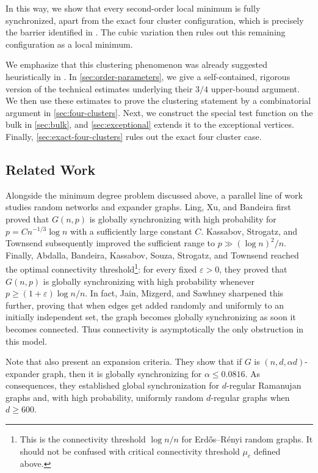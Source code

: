 \documentclass[reqno,11pt]{amsart}
\theoremstyle{definition}
\begin{document}
In this way, we show that every second-order local minimum is fully
synchronized, apart from the exact four cluster configuration, which is
precisely the barrier identified in
\cite[Section~6]{kassabov-strogatz-townsend-dense}. The cubic variation
then rules out this remaining configuration as a local minimum.

We emphasize that this clustering phenomenon was already suggested
heuristically in \cite[Section~6]{kassabov-strogatz-townsend-dense}. In
\cref{sec:order-parameters}, we give a self-contained, rigorous version of
the technical estimates underlying their $3/4$ upper-bound
argument. We then use these estimates to prove the clustering statement by a combinatorial
argument in \cref{sec:four-clusters}. Next, we construct  the special test function on the bulk in \cref{sec:bulk}, and \cref{sec:exceptional} extends it to the exceptional vertices. Finally, \cref{sec:exact-four-clusters}
rules out the exact four cluster case.

\subsection{Related Work}

Alongside the minimum degree problem discussed above, a parallel
line of work studies random networks and expander graphs. Ling, Xu, and
Bandeira \cite{ling-xu-bandeira} first proved that $G(n,p)$ is globally synchronizing with high
probability for $p=Cn^{-1/3}\log n$ with a sufficiently large constant
$C$. Kassabov, Strogatz, and Townsend \cite{kassabov-strogatz-townsend-random} subsequently
improved the sufficient range to $p\gg (\log n)^2/n$. Finally, Abdalla, Bandeira, Kassabov,
Souza, Strogatz, and Townsend \cite{bandeira-expanders} reached the optimal connectivity threshold\footnote{This is the connectivity threshold $\log n / n$ for Erd\H{o}s--R\'{e}nyi random graphs. It should not be confused with critical connectivity threshold $\mu_c$ defined above.}: for every fixed $\varepsilon>0$, they proved that $G(n,p)$ is globally
synchronizing with high probability whenever
$p\geq (1+\varepsilon)\log n/n$. In fact, Jain, Mizgerd, and Sawhney \cite{jain-mizgerd-sawhney} sharpened this further, proving that when edges get added randomly and uniformly to an initially independent set, the graph becomes globally synchronizing as soon it becomes connected. Thus connectivity is asymptotically the only obstruction in this model.

Note that \cite{bandeira-expanders} also present an expansion criteria. They show that if $G$ is $(n, d, \alpha d)$-expander graph, then it is globally synchronizing for $\alpha\leq 0.0816$. As consequences, they established global
synchronization for $d$-regular Ramanujan graphs and, with high probability, uniformly random $d$-regular graphs when $d\geq 600$. 
\end{document}

